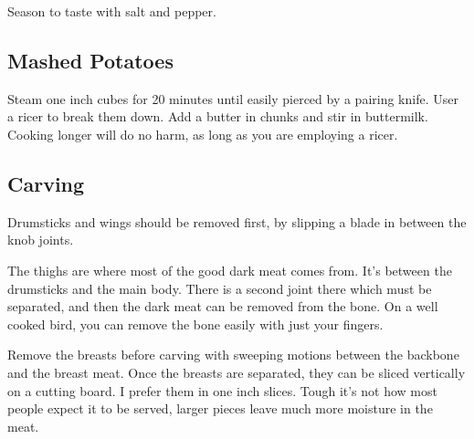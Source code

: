 \begin{recipe}
Season to taste with salt and pepper.

\subsection{Mashed Potatoes}


Steam one inch cubes for 20 minutes until easily pierced by a pairing knife. User a ricer to break them down. Add a butter in chunks and stir in buttermilk. Cooking longer will do no harm, as long as you are employing a ricer.

\subsection{Carving}

Drumsticks and wings should be removed first, by slipping a blade in between the knob joints.

The thighs are where most of the good dark meat comes from. It's between the drumsticks and the main body. There is a second joint there which must be separated, and then the dark meat can be removed from the bone. On a well cooked bird, you can remove the bone easily with just your fingers.

Remove the breasts before carving with sweeping motions between the backbone and the breast meat. Once the breasts are separated, they can be sliced vertically on a cutting board. I prefer them in one inch slices. Tough it's not how most people expect it to be served, larger pieces leave much more moisture in the meat.

\end{recipe}
